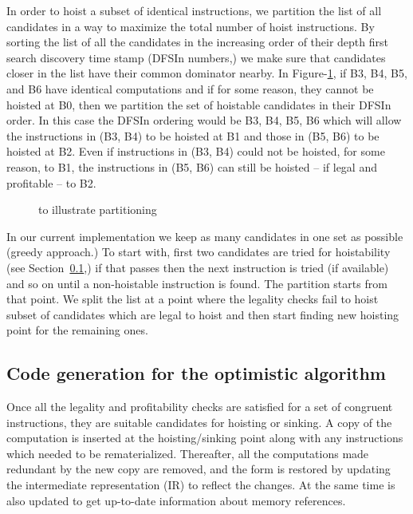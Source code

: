 \documentclass[acmlarge,review,anonymous]{acmart}\settopmatter{printfolios=true}
\begin{document}
In order to hoist a subset of identical instructions, we partition the list of
all candidates in a way to maximize the total number of hoist instructions.  By sorting
the list of all the candidates in the increasing order of their depth first
search discovery time stamp \cite{clrs} (DFSIn numbers,) we make sure that
candidates closer in the list have their common dominator nearby. In
Figure-\ref{fig:dfsin}, if B3, B4, B5, and B6 have identical computations and if
for some reason, they cannot be hoisted at B0, then we partition the set of
hoistable candidates in their DFSIn order. In this case the DFSIn ordering would
be B3, B4, B5, B6 which will allow the instructions in (B3, B4) to be hoisted at
B1 and those in (B5, B6) to be hoisted at B2. Even if instructions in (B3, B4)
could not be hoisted, for some reason, to B1, the instructions in (B5, B6) can
still be hoisted -- if legal and profitable -- to B2.

\begin{figure}
\centering
\caption{\CFG{} to illustrate partitioning}
\label{fig:dfsin}
\end{figure}

In our current implementation we keep as many candidates in one set as possible
(greedy approach.) To start with, first two candidates are tried for
hoistability (see Section~\ref{subsec:optimistic},) if that passes then the next
instruction is tried (if available) and so on until a non-hoistable instruction
is found. The partition starts from that point.  We split the list at a point
where the legality checks fail to hoist subset of candidates which are legal to
hoist and then start finding new hoisting point for the remaining ones.

\subsection{Code generation for the optimistic \gcm{} algorithm}
\label{subsec:optimistic}
Once all the legality and profitability checks are satisfied for a set of
congruent instructions, they are suitable candidates for hoisting or sinking. A
copy of the computation is inserted at the hoisting/sinking point along with any
instructions which needed to be rematerialized. Thereafter, all the computations
made redundant by the new copy are removed, and the \SSA{} form is restored by
updating the intermediate representation (IR) to reflect the changes. At the
same time \MemorySSA{} is also updated to get up-to-date information about
memory references.
\end{document}
